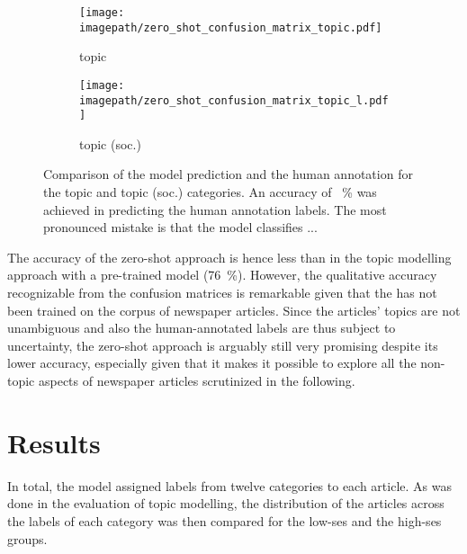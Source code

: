 \begin{figure}
    \centering
    \begin{subfigure}{0.48\textwidth}
        \centering
        \texttt{[image: \\imagepath/zero\_shot\_confusion\_matrix\_topic.pdf]}
        \caption{topic}\label{fig:zero_shot_confusion_matrix_topic}
    \end{subfigure}
    \hspace{0.03\textwidth}
    \begin{subfigure}{0.48\textwidth}
        \centering
        \texttt{[image: \\imagepath/zero\_shot\_confusion\_matrix\_topic\_l.pdf]}
        \caption{topic (soc.)}\label{fig:zero_shot_confusion_matrix_topic_l}
    \end{subfigure}
    \caption{Comparison of the model prediction and the human annotation for the topic and topic (soc.) categories. An accuracy of \SI{}{\percent} was achieved in predicting the human annotation labels. The most pronounced mistake is that the model classifies ...}\label{fig:zero_shot_confusion_matrices}
\end{figure}

The accuracy of the zero-shot approach is hence less than in the topic modelling approach with a pre-trained model (\SI{76}{\percent}). However, the qualitative accuracy recognizable from the confusion matrices is remarkable given that the has not been trained on the corpus of newspaper articles. Since the articles' topics are not unambiguous and also the human-annotated labels are thus subject to uncertainty, the zero-shot approach is arguably still very promising despite its lower accuracy, especially given that it makes it possible to explore all the non-topic aspects of newspaper articles scrutinized in the following.


\section{Results}\label{ch:supervised_results}
In total, the model assigned labels from twelve categories to each article. As was done in the evaluation of topic modelling, the distribution of the articles across the labels of each category was then compared for the low-\gls{ses} and the high-\gls{ses} groups.

